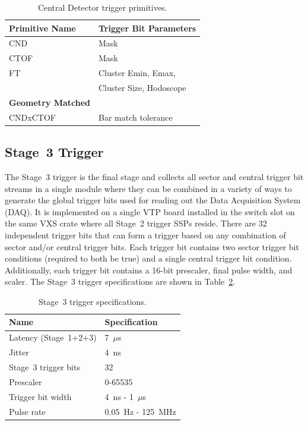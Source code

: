 \begin{table}
\begin{center}
	\begin{tabular}{| l | l |}
		\hline \hline
		Primitive Name			& Trigger Bit Parameters	\\
		\hline
		CND     			& Mask				\\
		CTOF    			& Mask				\\
		FT				& Cluster Emin, Emax, 		\\
						& Cluster Size, Hodoscope	\\
		{\bf Geometry Matched}		&				\\
		CNDxCTOF			& Bar match tolerance		\\
		\hline \hline
	\end{tabular}
\end{center}
\caption{Central Detector trigger primitives.}
\label{tab:cd_trig_primitives}
\end{table}

\subsection{Stage~3 Trigger}

The Stage~3 trigger is the final stage and collects all sector and central trigger bit streams in a single
module where they can be combined in a variety of ways to generate the global trigger bits used for reading
out the Data Acquisition System (DAQ). It is implemented on a single VTP board installed in the switch slot on
the same VXS crate where all Stage~2 trigger SSPs reside. There are 32 independent trigger bits that can
form a trigger based on any combination of sector and/or central trigger bits. Each trigger bit contains two
sector trigger bit conditions (required to both be true) and a single central trigger bit condition. Additionally,
each trigger bit contains a 16-bit prescaler, final pulse width, and scaler. The Stage~3 trigger specifications
are shown in Table~\ref{tab:stage_3_specs}.

\begin{table}
\begin{center}
	\begin{tabular}{| l | l |}
		\hline \hline
		Name				& Specification	\\
		\hline
		Latency (Stage~1+2+3)		& 7~$\mu$s	\\
		Jitter				& 4~ns		\\
		Stage~3 trigger bits		& 32		\\
		Prescaler			& 0-65535	\\
		Trigger bit width		& 4~ns - 1~$\mu$s	\\
		Pulse rate			& 0.05~Hz - 125~MHz	\\
		\hline \hline
	\end{tabular}
\end{center}
\caption{Stage~3 trigger specifications.}
\label{tab:stage_3_specs}
\end{table}

